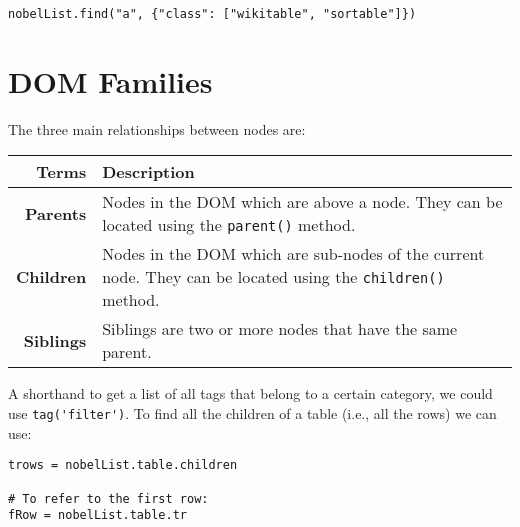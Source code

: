 \vspace{-15pt}
\begin{verbatim}
nobelList.find("a", {"class": ["wikitable", "sortable"]})
\end{verbatim}
\vspace{-10pt}	

\section{DOM Families}
The three main relationships between nodes are:

\noindent
\begin{tabular}{rM{0.85}}
	\toprule
	\textbf{Terms} &\textbf{Description} \\
	\midrule
	\textbf{Parents}	&Nodes in the DOM which are above a node. They can be located using the \verb|parent()| method. \\
	\textbf{Children}	&Nodes in the DOM which are sub-nodes of the current node. They can be located using the \verb|children()| method.\\
	\textbf{Siblings}	&Siblings are two or more nodes that have the same parent.\\
	\bottomrule
\end{tabular}

A shorthand to get a list of all tags that belong to a certain category, we could use \verb|tag('filter')|. To find all the children of a table (i.e., all the rows) we can use:

\vspace{-15pt}
\begin{verbatim}
trows = nobelList.table.children

# To refer to the first row:
fRow = nobelList.table.tr
\end{verbatim}
\vspace{-10pt}	

\noindent


